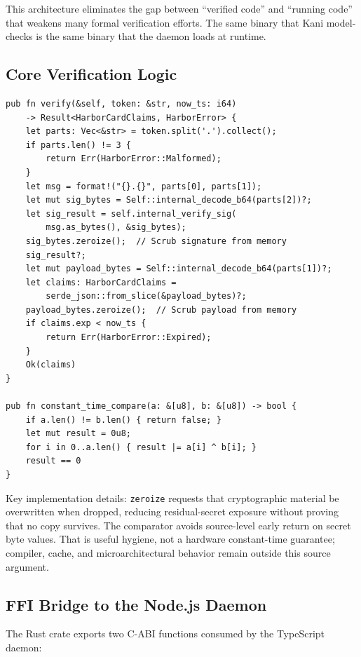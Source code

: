 \documentclass[11pt,a4paper]{article}
\theoremstyle{definition}
\begin{document}
This architecture eliminates the gap between ``verified code'' and ``running code'' that weakens many formal verification efforts. The same binary that Kani model-checks is the same binary that the daemon loads at runtime.

\subsection{Core Verification Logic}

\begin{lstlisting}[style=rust, caption={Deployed Rust Implementation — Harbor Card Verifier (abridged from the \texttt{harbor-card-rs} crate)}]
pub fn verify(&self, token: &str, now_ts: i64)
    -> Result<HarborCardClaims, HarborError> {
    let parts: Vec<&str> = token.split('.').collect();
    if parts.len() != 3 {
        return Err(HarborError::Malformed);
    }
    let msg = format!("{}.{}", parts[0], parts[1]);
    let mut sig_bytes = Self::internal_decode_b64(parts[2])?;
    let sig_result = self.internal_verify_sig(
        msg.as_bytes(), &sig_bytes);
    sig_bytes.zeroize();  // Scrub signature from memory
    sig_result?;
    let mut payload_bytes = Self::internal_decode_b64(parts[1])?;
    let claims: HarborCardClaims =
        serde_json::from_slice(&payload_bytes)?;
    payload_bytes.zeroize();  // Scrub payload from memory
    if claims.exp < now_ts {
        return Err(HarborError::Expired);
    }
    Ok(claims)
}

pub fn constant_time_compare(a: &[u8], b: &[u8]) -> bool {
    if a.len() != b.len() { return false; }
    let mut result = 0u8;
    for i in 0..a.len() { result |= a[i] ^ b[i]; }
    result == 0
}
\end{lstlisting}

Key implementation details: \texttt{zeroize} requests that cryptographic material be overwritten when dropped, reducing residual-secret exposure without proving that no copy survives. The comparator avoids source-level early return on secret byte values. That is useful hygiene, not a hardware constant-time guarantee; compiler, cache, and microarchitectural behavior remain outside this source argument.

\subsection{FFI Bridge to the Node.js Daemon}

The Rust crate exports two C-ABI functions consumed by the TypeScript daemon:
\end{document}
